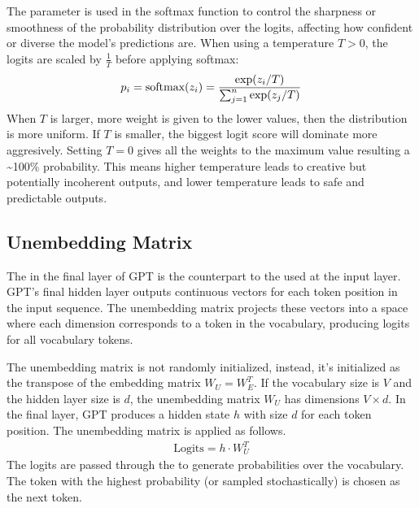 \documentclass[letterpaper,11pt,english]{sphinxmanual}
\begin{document}
\sphinxAtStartPar
The  parameter is used in the softmax function to control
the sharpness or smoothness of the probability distribution over the
logits, affecting how confident or diverse the model’s predictions are.
When using a temperature \(T > 0\), the logits are scaled by
\(\frac{1}{T}\) before applying softmax:
\begin{equation*}
\begin{split}p_i = \text{softmax}(z_i) = {\exp(z_i/T)\over \sum^n_{j=1}\exp(z_j/T)}\end{split}
\end{equation*}
\sphinxAtStartPar
When \(T\) is larger, more weight is given to the lower values, then
the distribution is more uniform. If \(T\) is smaller, the biggest
logit score will dominate more aggresively. Setting \(T=0\) gives
all the weights to the maximum value resulting a \textasciitilde{}100\% probability. This
means higher temperature leads to creative but potentially incoherent
outputs, and lower temperature leads to safe and predictable outputs.


\subsection{Unembedding Matrix}
\label{\detokenize{pretraining:unembedding-matrix}}
\sphinxAtStartPar
The  in the final layer of GPT is the counterpart
to the  used at the input layer. GPT’s final hidden
layer outputs continuous vectors for each token position in the input
sequence. The unembedding matrix projects these vectors into a space
where each dimension corresponds to a token in the vocabulary, producing
logits for all vocabulary tokens.

\sphinxAtStartPar
The unembedding matrix is not randomly initialized, instead, it’s
initialized as the transpose of the embedding matrix
\(W_U = W_E^T\). If the vocabulary size is \(V\) and the hidden
layer size is \(d\), the unembedding matrix \(W_U\) has
dimensions \(V \times d\). In the final layer, GPT produces a hidden
state \(h\) with size \(d\) for each token position. The
unembedding matrix is applied as follows.
\begin{equation*}
\begin{split}\text{Logits} = h \cdot W_U^T\end{split}
\end{equation*}
\sphinxAtStartPar
The logits are passed through the  to generate
probabilities over the vocabulary. The token with the highest
probability (or sampled stochastically) is chosen as the next token.
\end{document}
